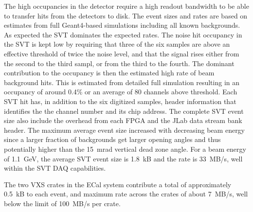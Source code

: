 The high occupancies in the detector require a high readout bandwidth to be able to transfer hits from the 
detectors to disk. The event sizes and rates are based on estimates from full Geant4-based simulations 
including all known backgrounds. As expected the SVT dominates the expected rates. 
The noise hit occupancy in the SVT is kept low by requiring that three of the six samples are above an
effective threshold of twice the noise level, and that the signal rises either from the second to the third sampl, or from the third to the fourth. 
The dominant contribution to the occupancy is then 
the estimated high rate of beam background hits. This is estimated 
from detailed full simulation resulting in an occupancy of around 0.4\% or an average of 80 channels above threshold.  
Each SVT hit has, in addition to the six digitized samples,  header information that identifies the 
the channel number and its chip address. The complete SVT event size also 
include the overhead from each FPGA and the JLab data stream bank header.  
The maximum average event size increased with decreasing beam energy since a larger 
fraction of backgrounds get larger opening angles and thus potentially higher than the 15~mrad 
vertical dead zone angle. For a beam energy of 1.1~GeV, the average SVT event size is 1.8~kB and 
the rate is 33~MB/s, well within the SVT DAQ capabilities. 

The two VXS crates in the ECal system contribute a total of 
approximately 0.5~kB to each event, and maximum rate across the crates of about 7~MB/s, well below the limit of 100~MB/s per crate. 

